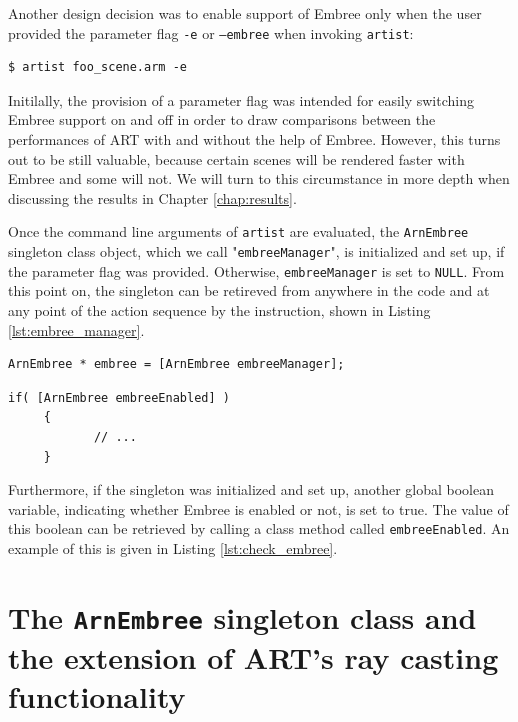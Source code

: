 Another design decision was to enable support of Embree only when the user provided the parameter flag \texttt{-e} or \texttt{--embree} when invoking \texttt{artist}:

\begin{Verbatim}
$ artist foo_scene.arm -e
\end{Verbatim}

Initilally, the provision of a parameter flag was intended for easily switching Embree support on and off in order to draw comparisons between the performances of ART with and without the help of Embree. However, this turns out to be still valuable, because certain scenes will be rendered faster with Embree and some will not. We will turn to this circumstance in more depth when discussing the results in Chapter \ref{chap:results}. 

Once the command line arguments of \texttt{artist} are evaluated, the \texttt{ArnEmbree} singleton class object, which we call "\texttt{embreeManager}", is initialized and set up, if the parameter flag was provided. Otherwise, \texttt{embreeManager} is set to \texttt{NULL}. From this point on, the  singleton can be retireved from anywhere in the code and at any point of the action sequence by the instruction, shown in Listing \ref{lst:embree_manager}.

\begin{listing} 
	\begin{lstlisting}[caption={Retrieving the \texttt{ArnEmbree} singleton.}, label={lst:embree_manager}]
	ArnEmbree * embree = [ArnEmbree embreeManager];
	\end{lstlisting}
\end{listing}


\begin{listing}
	\begin{lstlisting}[caption={Verifying if the \texttt{ArnEmbree} singleton was initialized.}, label={lst:check_embree}]
	 if( [ArnEmbree embreeEnabled] ) 
	 {
	 		// ...
	 }
	\end{lstlisting}
\end{listing}

Furthermore, if the singleton was initialized and set up, another global boolean variable, indicating whether Embree is enabled or not, is set to true. The value of this boolean can be retrieved by calling a class method called \texttt{embreeEnabled}. An example of this is given in Listing \ref{lst:check_embree}.

\section{The \texttt{ArnEmbree} singleton class and the extension of ART's ray casting functionality}

